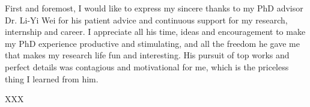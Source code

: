 

\begin{acknowledgements}      %

First and foremost, I would like to express my sincere thanks to my PhD advisor Dr. Li-Yi Wei for his patient advice and continuous support for my research, internship and career. 
I appreciate all his time, ideas and encouragement to make my PhD experience productive and stimulating, and all the freedom he gave me that makes my research life fun and interesting. 
His pursuit of top works and perfect details was contagious and motivational for me, which is the priceless thing I learned from him.

XXX

\end{acknowledgements}



